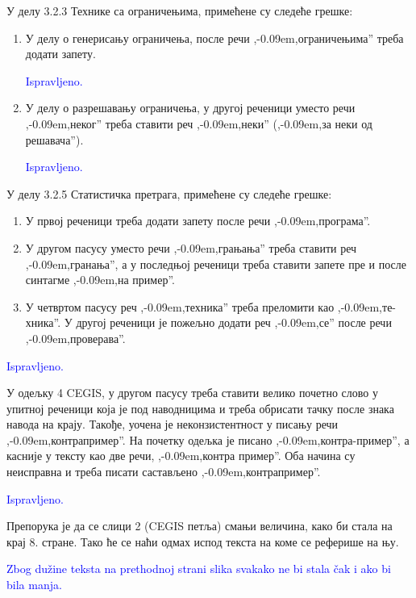 \documentclass[a4paper]{report}
\newcommand{\odgovor}[1]{\textcolor{blue}{#1}}
\def\zn{,\kern-0.09em,}
\begin{document}
\par У делу 3.2.3 Технике са ограничењима, примећене су следеће грешке:
\begin{enumerate}
\item У делу о генерисању ограничења, после речи \zn ограничењима'' треба додати запету.

\odgovor {Ispravljeno.}

\item У делу о разрешавању ограничења, у другој реченици уместо речи \zn неког'' треба ставити реч \zn неки'' (\zn за неки од решавача'').

\odgovor {Ispravljeno.}

\end{enumerate}


\par У делу 3.2.5 Статистичка претрага, примећене су следеће грешке:
\begin{enumerate}
\item У првој реченици треба додати запету после речи \zn програма''.
\item У другом пасусу уместо речи \zn грањања'' треба ставити реч \zn гранања'', а у последњој реченици треба ставити запете пре и после синтагме \zn на пример''.
\item У четвртом пасусу реч \zn техника'' треба преломити као \zn те-хника''. У другој реченици је пожељно додати реч \zn се'' после речи \zn проверава''.
\end{enumerate}

\odgovor {Ispravljeno.}

\par У одељку 4 CEGIS, у другом пасусу треба ставити велико почетно слово у упитној реченици која је под наводницима и треба обрисати тачку после знака навода на крају. Такође, уочена је неконзистентност у писању речи \zn контрапример''. На почетку одељка је писано \zn контра-пример'', а касније у тексту као две речи, \zn контра пример''. Оба начина су неисправна и треба писати састављено \zn контрапример''.

\odgovor{Ispravljeno.}

\par Препорука је да се слици 2 (CEGIS петља) смањи величина, како би стала на крај 8. стране. Тако ће се наћи одмах испод текста на коме се реферише на њу.

\odgovor{Zbog dužine teksta na prethodnoj strani slika svakako ne bi stala čak i ako bi bila manja.}
\end{document}
